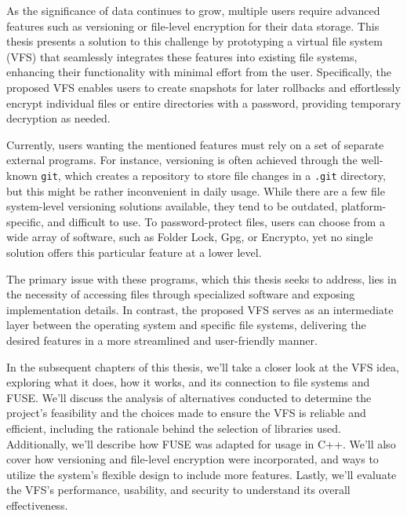

As the significance of data continues to grow, multiple users require advanced features such as versioning or file-level encryption for their data storage.
This thesis presents a solution to this challenge by prototyping a virtual file system (VFS) that seamlessly integrates these features into existing file systems, enhancing their functionality with minimal effort from the user.
Specifically, the proposed VFS enables users to create snapshots for later rollbacks and effortlessly encrypt individual files or entire directories with a password, providing temporary decryption as needed.

Currently, users wanting the mentioned features must rely on a set of separate external programs.
For instance, versioning is often achieved through the well-known \texttt{git}, which creates a repository to store file changes in a \texttt{.git} directory, but this might be rather inconvenient in daily usage.
While there are a few file system-level versioning solutions available, they tend to be outdated, platform-specific, and difficult to use.
To password-protect files, users can choose from a wide array of software, such as Folder Lock, Gpg, or Encrypto, yet no single solution offers this particular feature at a lower level.

The primary issue with these programs, which this thesis seeks to address, lies in the necessity of accessing files through specialized software and exposing implementation details.
In contrast, the proposed VFS serves as an intermediate layer between the operating system and specific file systems, delivering the desired features in a more streamlined and user-friendly manner.


In the subsequent chapters of this thesis, we'll take a closer look at the VFS idea, exploring what it does, how it works, and its connection to file systems and FUSE. We'll discuss the analysis of alternatives conducted to determine the project's feasibility and the choices made to ensure the VFS is reliable and efficient, including the rationale behind the selection of libraries used.
Additionally, we'll describe how FUSE was adapted for usage in C++.
We'll also cover how versioning and file-level encryption were incorporated, and ways to utilize the system's flexible design to include more features.
Lastly, we'll evaluate the VFS's performance, usability, and security to understand its overall effectiveness.